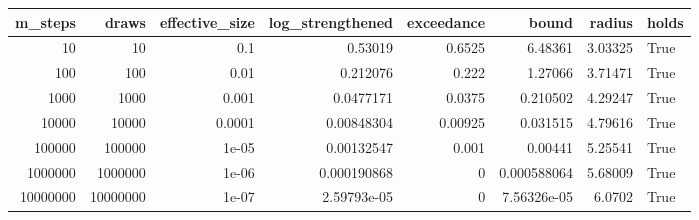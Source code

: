 \begin{tabular}{rrrrrrrl}
\toprule
m_steps & draws & effective_size & log_strengthened & exceedance & bound & radius & holds \\
\midrule
10 & 10 & 0.1 & 0.53019 & 0.6525 & 6.48361 & 3.03325 & True \\
100 & 100 & 0.01 & 0.212076 & 0.222 & 1.27066 & 3.71471 & True \\
1000 & 1000 & 0.001 & 0.0477171 & 0.0375 & 0.210502 & 4.29247 & True \\
10000 & 10000 & 0.0001 & 0.00848304 & 0.00925 & 0.031515 & 4.79616 & True \\
100000 & 100000 & 1e-05 & 0.00132547 & 0.001 & 0.00441 & 5.25541 & True \\
1000000 & 1000000 & 1e-06 & 0.000190868 & 0 & 0.000588064 & 5.68009 & True \\
10000000 & 10000000 & 1e-07 & 2.59793e-05 & 0 & 7.56326e-05 & 6.0702 & True \\
\bottomrule
\end{tabular}
